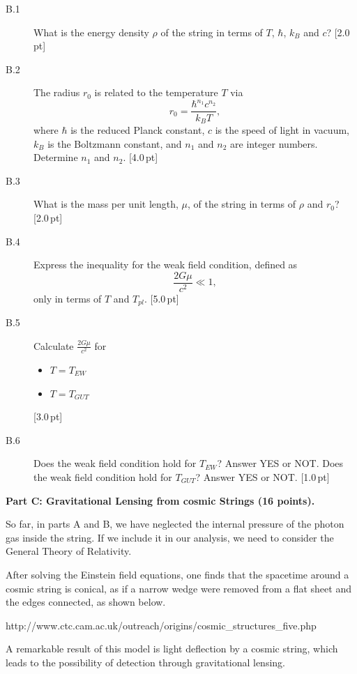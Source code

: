 \begin{description}
\item[B.1] What is the energy density $\rho$ of the string in terms of $T$,
  $\hbar$, $k_B$ and $c$? \hfill[2.0\,pt]
\item[B.2] The radius $r_0$ is related to the temperature $T$ via
  \[ r_0 = \frac{\hbar^{n_1} c^{n_2}}{k_B T}, \]
  where $\hbar$ is the reduced Planck constant, $c$ is the speed of light in
  vacuum, $k_B$ is the Boltzmann constant, and $n_1$ and $n_2$ are integer
  numbers. Determine $n_1$ and $n_2$. \hfill[4.0\,pt]
\item[B.3] What is the mass per unit length, $\mu$, of the string in terms of
  $\rho$ and $r_0$? \hfill[2.0\,pt]
\item[B.4] Express the inequality for the weak field condition, defined as
  \[ \frac{2G\mu}{c^2} \ll 1, \]
  only in terms of $T$ and $T_{pl}$. \hfill[5.0\,pt]
\item[B.5] Calculate $\frac{2G\mu}{c^2}$ for
  \begin{itemize}
  \item $T = T_{EW}$
  \item $T = T_{GUT}$
  \end{itemize}
  \hfill[3.0\,pt]
\item[B.6] Does the weak field condition hold for $T_{EW}$? Answer YES or NOT.
  Does the weak field condition hold for $T_{GUT}$? Answer YES or NOT.
  \hfill[1.0\,pt]
\end{description}

\medskip
\textbf{Part C: Gravitational Lensing from cosmic Strings (16 points).}

So far, in parts A and B, we have neglected the internal pressure of the
photon gas inside the string. If we include it in our analysis, we need to
consider the General Theory of Relativity.

After solving the Einstein field equations, one finds that the spacetime
around a cosmic string is conical, as if a narrow wedge were removed from a
flat sheet and the edges connected, as shown below.


{\centering\small
http://www.ctc.cam.ac.uk/outreach/origins/cosmic\_structures\_five.php\par}

A remarkable result of this model is light deflection by a cosmic string,
which leads to the possibility of detection through gravitational lensing.

